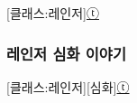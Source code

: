 \documentclass{report}
\begin{document}
	\begin{story}{}{[클래스:레인저]\hyperlink{celesteela}{ⓣ}}
		
	\end{story}
	
	\subsubsection{레인저 심화 이야기}
		\begin{story}{}{[클래스:레인저][심화]\hyperlink{celesteela}{ⓣ}}
			
		\end{story}
\end{document}
